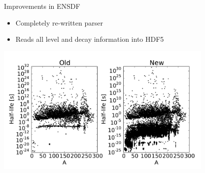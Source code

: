 \documentclass[xcolor=x11names,compress]{beamer}
\begin{document}
\begin{frame}{Improvements in ENSDF}
    \begin{itemize}
        \item Completely re-written parser
        \item Reads all level and decay information into HDF5
    \end{itemize}

    \includegraphics[height=2.5in,clip]{ensdf.pdf}

\end{frame}
\end{document}
